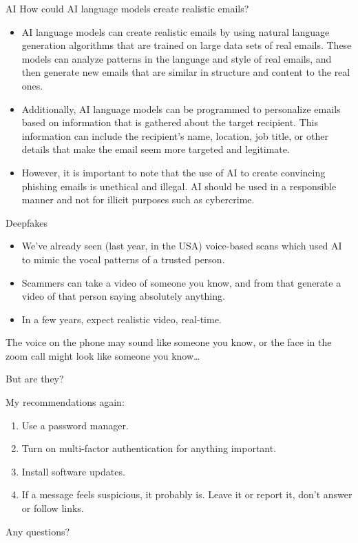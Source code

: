 \documentclass[xcolor=table]{beamer}
\begin{document}
\begin{frame}{AI}
	How could AI language models create realistic emails?
	\begin{itemize}
		\item AI language models can create realistic emails by using natural language generation algorithms that are trained on large data sets of real emails. These models can analyze patterns in the language and style of real emails, and then generate new emails that are similar in structure and content to the real ones.

		\item Additionally, AI language models can be programmed to personalize emails based on information that is gathered about the target recipient. This information can include the recipient's name, location, job title, or other details that make the email seem more targeted and legitimate.

		\item However, it is important to note that the use of AI to create convincing phishing emails is unethical and illegal. AI should be used in a responsible manner and not for illicit purposes such as cybercrime.
	\end{itemize}
\end{frame}
\begin{frame}{Deepfakes}
	\begin{itemize}
		\item We've already seen (last year, in the USA) voice-based scans which used AI to mimic the vocal patterns of a trusted person.
		\item Scammers can take a video of someone you know, and from that generate a video of that person saying absolutely anything.
		\item In a few years, expect realistic video, real-time. 
	\end{itemize}

	The voice on the phone may sound like someone you know, or the face in the zoom call might look like someone you know\ldots 

	\vspace{0.5em}

	But are they?
\end{frame}
\begin{frame}{My recommendations again:}
	\begin{enumerate}
		\item Use a password manager.
		\item Turn on multi-factor authentication
			for anything important.
		\item Install software updates.
		\item If a message feels suspicious, it
			probably is. Leave it or report it,
			don't answer or follow links.
	\end{enumerate}
\end{frame}

\begin{frame}{Any questions?}
\end{frame}
\end{document}
